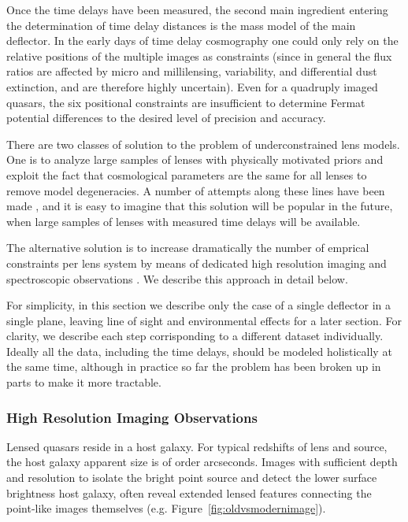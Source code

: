 Once the time delays have been measured, the second main ingredient
entering the determination of time delay distances is the mass model
of the main deflector. In the early days of time delay cosmography one
could only rely on the relative positions of the multiple images as
constraints (since in general the flux ratios are affected by micro
and millilensing, variability, and differential dust extinction, and
are therefore highly uncertain). Even for a quadruply imaged quasars,
the six positional constraints are insufficient to determine Fermat
potential differences to the desired level of precision and accuracy.

There are two classes of solution to the problem of underconstrained
lens models. One is to analyze large samples of lenses with physically
motivated priors and exploit the fact that cosmological parameters are
the same for all lenses to remove model degeneracies. A number of
attempts along these lines have been made \citep{Ogu07b,RK++2015}, and
it is easy to imagine that this solution will be popular in the
future, when large samples of lenses with measured time delays will be
available.

The alternative solution is to increase dramatically the number of
emprical constraints per lens system by means of dedicated high
resolution imaging and spectroscopic observations
\citep{Suy++10,Suy++13,Suy++14}. We describe this approach in detail
below.

For simplicity, in this section we describe only the case of a single
deflector in a single plane, leaving line of sight and environmental
effects for a later section. For clarity, we describe each step
corrisponding to a different dataset individually. Ideally all the
data, including the time delays, should be modeled holistically at the
same time, although in practice so far the problem has been broken up
in parts to make it more tractable.


\subsubsection{High Resolution Imaging Observations}

Lensed quasars reside in a host galaxy. For typical redshifts of lens
and source, the host galaxy apparent size is of order
arcseconds. Images with sufficient depth and resolution to isolate the
bright point source and detect the lower surface brightness host
galaxy, often reveal extended lensed features connecting the
point-like images themselves (e.g. Figure~\ref{fig:oldvsmodernimage}).

